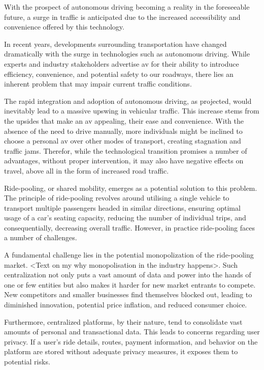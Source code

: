 With the prospect of autonomous driving becoming a reality in the foreseeable future, a surge in traffic is anticipated due to the increased accessibility and convenience offered by this technology.

In recent years, developments surrounding transportation have changed dramatically with the surge in technologies such as autonomous driving. While experts and industry stakeholders advertise \gls{av} for their ability to introduce efficiency, convenience, and potential safety to our roadways, there lies an inherent problem that may impair current traffic conditions.

The rapid integration and adoption of autonomous driving, as projected, would inevitably lead to a massive upswing in vehicular traffic. This increase stems from the upsides that make an \gls{av} appealing, their ease and convenience. With the absence of the need to drive manually, more individuals might be inclined to choose a personal \gls{av} over other modes of transport, creating stagnation and traffic jams. Therefor, while the technological transition promises a number of advantages, without proper intervention, it may also have negative effects on  travel, above all in the form of  increased road traffic.

Ride-pooling, or shared mobility, emerges as a potential solution to this problem. The principle of ride-pooling revolves around utilising a single vehicle to transport multiple passengers headed in similar directions, ensuring optimal usage of a car's seating capacity, reducing the number of individual trips, and consequentially, decreasing overall traffic. However, in practice ride-pooling faces a number of challenges.

A fundamental challenge lies in the potential monopolization of the ride-pooling market. <Text on my why monopolisation in the industry happens>. Such centralization not only puts a vast amount of data and power into the hands of one or few entities but also makes it harder for new market entrants to compete. New competitors and smaller businesses find themselves blocked out, leading to diminished innovation, potential price inflation, and reduced consumer choice.

Furthermore, centralized platforms, by their nature, tend to consolidate vast amounts of personal and transactional data. This leads to concerns regarding user privacy. If a user’s ride details, routes, payment information, and behavior on the platform are stored without adequate privacy measures, it exposes them to potential risks.

